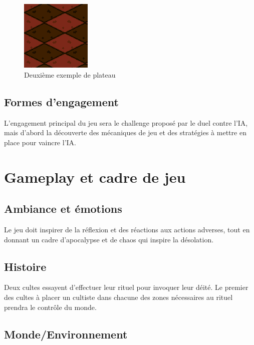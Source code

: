 \documentclass[a4paper]{scrreprt}
\begin{document}
\begin{figure}
\centering
\includegraphics[width=0.3\textwidth]{images/example2.png}
\caption{\label{fig:art2} Deuxième exemple de plateau}
\end{figure}

\section{Formes d'engagement}

L'engagement principal du jeu sera le challenge proposé par le duel contre l'IA, mais d'abord la découverte des mécaniques de jeu et des stratégies à mettre en place pour vaincre l'IA.



\chapter{Gameplay et cadre de jeu}

\section{Ambiance et émotions}

Le jeu doit inspirer de la réflexion et des réactions aux actions adverses, tout en donnant un cadre d'apocalypse et de chaos qui inspire la désolation.

\section{Histoire}

Deux cultes essayent d'effectuer leur rituel pour invoquer leur déité. Le premier des cultes à placer un cultiste dans chacune des zones nécessaires au rituel prendra le contrôle du monde.

\section{Monde/Environnement}
\end{document}
